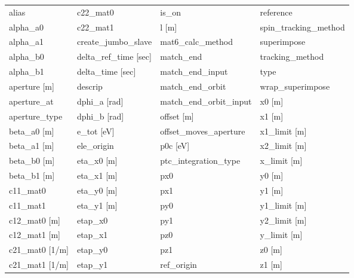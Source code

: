  \begin{tabular}{llll} \toprule
alias                            & c22_mat0                         & is_on                            & reference                        \\
alpha_a0                         & c22_mat1                         & l [m]                            & spin_tracking_method             \\
alpha_a1                         & create_jumbo_slave               & mat6_calc_method                 & superimpose                      \\
alpha_b0                         & delta_ref_time [sec]             & match_end                        & tracking_method                  \\
alpha_b1                         & delta_time [sec]                 & match_end_input                  & type                             \\
aperture [m]                     & descrip                          & match_end_orbit                  & wrap_superimpose                 \\
aperture_at                      & dphi_a [rad]                     & match_end_orbit_input            & x0 [m]                           \\
aperture_type                    & dphi_b [rad]                     & offset [m]                       & x1 [m]                           \\
beta_a0 [m]                      & e_tot [eV]                       & offset_moves_aperture            & x1_limit [m]                     \\
beta_a1 [m]                      & ele_origin                       & p0c [eV]                         & x2_limit [m]                     \\
beta_b0 [m]                      & eta_x0 [m]                       & ptc_integration_type             & x_limit [m]                      \\
beta_b1 [m]                      & eta_x1 [m]                       & px0                              & y0 [m]                           \\
c11_mat0                         & eta_y0 [m]                       & px1                              & y1 [m]                           \\
c11_mat1                         & eta_y1 [m]                       & py0                              & y1_limit [m]                     \\
c12_mat0 [m]                     & etap_x0                          & py1                              & y2_limit [m]                     \\
c12_mat1 [m]                     & etap_x1                          & pz0                              & y_limit [m]                      \\
c21_mat0 [1/m]                   & etap_y0                          & pz1                              & z0 [m]                           \\
c21_mat1 [1/m]                   & etap_y1                          & ref_origin                       & z1 [m]                           \\
 \bottomrule
 \end{tabular}
